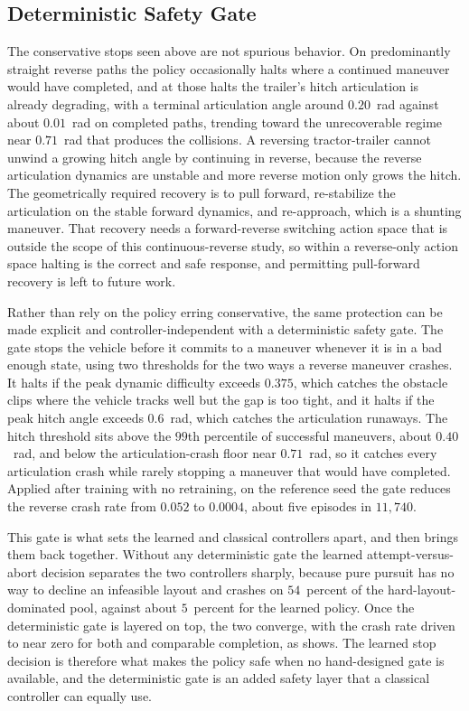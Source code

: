 

\subsection{Deterministic Safety Gate}

The conservative stops seen above are not spurious behavior. On predominantly straight reverse paths the policy occasionally halts where a continued maneuver would have completed, and at those halts the trailer's hitch articulation is already degrading, with a terminal articulation angle around $0.20$~rad against about $0.01$~rad on completed paths, trending toward the unrecoverable regime near $0.71$~rad that produces the collisions. A reversing tractor-trailer cannot unwind a growing hitch angle by continuing in reverse, because the reverse articulation dynamics are unstable and more reverse motion only grows the hitch. The geometrically required recovery is to pull forward, re-stabilize the articulation on the stable forward dynamics, and re-approach, which is a shunting maneuver. That recovery needs a forward-reverse switching action space that is outside the scope of this continuous-reverse study, so within a reverse-only action space halting is the correct and safe response, and permitting pull-forward recovery is left to future work.

Rather than rely on the policy erring conservative, the same protection can be made explicit and controller-independent with a deterministic safety gate. The gate stops the vehicle before it commits to a maneuver whenever it is in a bad enough state, using two thresholds for the two ways a reverse maneuver crashes. It halts if the peak dynamic difficulty exceeds $0.375$, which catches the obstacle clips where the vehicle tracks well but the gap is too tight, and it halts if the peak hitch angle exceeds $0.6$~rad, which catches the articulation runaways. The hitch threshold sits above the $99$th percentile of successful maneuvers, about $0.40$~rad, and below the articulation-crash floor near $0.71$~rad, so it catches every articulation crash while rarely stopping a maneuver that would have completed. Applied after training with no retraining, on the reference seed the gate reduces the reverse crash rate from $0.052$ to $0.0004$, about five episodes in $11{,}740$.

This gate is what sets the learned and classical controllers apart, and then brings them back together. Without any deterministic gate the learned attempt-versus-abort decision separates the two controllers sharply, because pure pursuit has no way to decline an infeasible layout and crashes on $54$~percent of the hard-layout-dominated pool, against about $5$~percent for the learned policy. Once the deterministic gate is layered on top, the two converge, with the crash rate driven to near zero for both and comparable completion, as  shows. The learned stop decision is therefore what makes the policy safe when no hand-designed gate is available, and the deterministic gate is an added safety layer that a classical controller can equally use.

